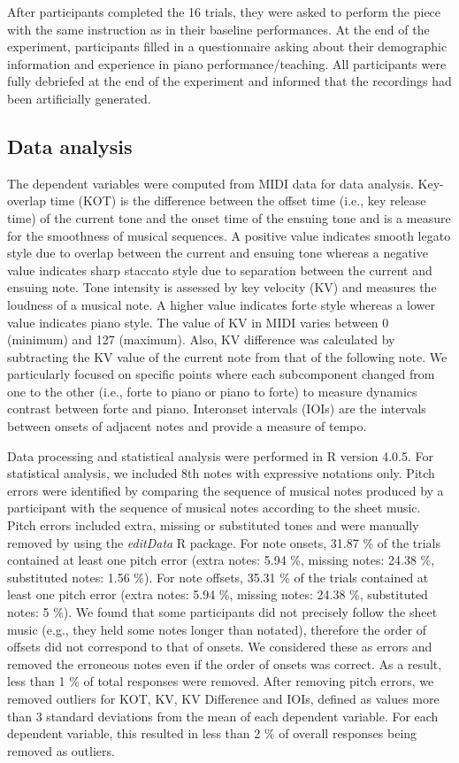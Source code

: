 \documentclass[
  man,floatsintext]{apa6}
\begin{document}
After participants completed the 16 trials, they were asked to perform the piece with the same instruction as in their baseline performances. At the end of the experiment, participants filled in a questionnaire asking about their demographic information and experience in piano performance/teaching. All participants were fully debriefed at the end of the experiment and informed that the recordings had been artificially generated.

\hypertarget{data-analysis}{%
\subsection{Data analysis}\label{data-analysis}}

The dependent variables were computed from MIDI data for data analysis. Key-overlap time (KOT) is the difference between the offset time (i.e., key release time) of the current tone and the onset time of the ensuing tone and is a measure for the smoothness of musical sequences. A positive value indicates smooth legato style due to overlap between the current and ensuing tone whereas a negative value indicates sharp staccato style due to separation between the current and ensuing note. Tone intensity is assessed by key velocity (KV) and measures the loudness of a musical note. A higher value indicates forte style whereas a lower value indicates piano style. The value of KV in MIDI varies between 0 (minimum) and 127 (maximum). Also, KV difference was calculated by subtracting the KV value of the current note from that of the following note. We particularly focused on specific points where each subcomponent changed from one to the other (i.e., forte to piano or piano to forte) to measure dynamics contrast between forte and piano. Interonset intervals (IOIs) are the intervals between onsets of adjacent notes and provide a measure of tempo.

Data processing and statistical analysis were performed in R version 4.0.5. For statistical analysis, we included 8th notes with expressive notations only. Pitch errors were identified by comparing the sequence of musical notes produced by a participant with the sequence of musical notes according to the sheet music. Pitch errors included extra, missing or substituted tones and were manually removed by using the \emph{editData} R package. For note onsets, 31.87 \% of the trials contained at least one pitch error (extra notes: 5.94 \%, missing notes: 24.38 \%, substituted notes: 1.56 \%). For note offsets, 35.31 \% of the trials contained at least one pitch error (extra notes: 5.94 \%, missing notes: 24.38 \%, substituted notes: 5 \%). We found that some participants did not precisely follow the sheet music (e.g., they held some notes longer than notated), therefore the order of offsets did not correspond to that of onsets. We considered these as errors and removed the erroneous notes even if the order of onsets was correct. As a result, less than 1 \% of total responses were removed. After removing pitch errors, we removed outliers for KOT, KV, KV Difference and IOIs, defined as values more than 3 standard deviations from the mean of each dependent variable. For each dependent variable, this resulted in less than 2 \% of overall responses being removed as outliers.
\end{document}

